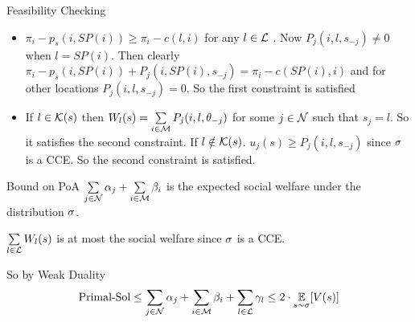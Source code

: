 \documentclass[aspectratio=1610,handout]{beamer}
\begin{document}
\begin{frame}{Feasibility Checking}
\begin{itemize}
    \item     $\pi_i-p_s(i,SP(i))\geq \pi_i-c(l,i)$ for any $l\in \mathcal{L}$ . Now $P_j(i,l,s_{-j})\neq 0$ when $l=SP(i)$. Then clearly $\pi_i-p_s(i,SP(i))+P_j(i,SP(i),s_{-j})=\pi_i-c(SP(i),i)$ and for other locations $P_j(i,l,s_{-j})=0$. So the first constraint is satisfied\pause
    
    \item If $l\in \mathcal{K}(s)$ then $W_l(s)=\sum\limits_{i\in\mathcal{M}}P_j(i,l,\theta_{-j})$ for some $j\in\mathcal{N}$ such that $s_j=l$. So it satisfies the second constraint. If $l\notin \mathcal{K}(s)$. $u_j(s)\geq P_j(i,l,s_{-j})$ since $\sigma$ is a \textsf{CCE}. So the second constraint is satisfied.
\end{itemize}


\end{frame}
\begin{frame}{Bound on \textsf{PoA}}
$\sum\limits_{j\in\mathcal{N}}\alpha_j+\sum\limits_{i\in\mathcal{M}}\beta_i$ is the expected social welfare under the distribution $\sigma$. \vspace*{5mm}

$\sum\limits_{l\in\mathcal{L}}W_l(s)$ is at most the social welfare since $\sigma$ is a \textsf{CCE}. \vspace*{5mm}

So by Weak Duality $$\text{Primal-Sol}\leq \sum\limits_{j\in\mathcal{N}}\alpha_j+\sum\limits_{i\in\mathcal{M}}\beta_i+\sum\limits_{l\in\mathcal{L}}\gamma_l\leq 2\cdot \underset{s\sim \sigma}{\mathbb{E}}[V(s)]$$

\end{frame}
\end{document}
